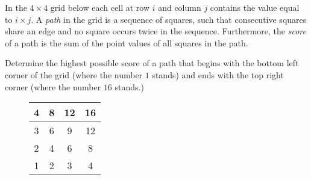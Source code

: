 \documentclass{article}
\begin{document}
\begin{example*}

    In the $4 \times 4$ grid below each cell at row $i$ and column $j$ contains the value equal to $i \times j.$
    A \textit{path} in the grid is a sequence of squares,
    such that consecutive squares share an edge and no square occurs twice in the sequence.
    Furthermore, the \textit{score} of a path is the sum of the point values of all squares in the path.

    Determine the highest possible score of a path that begins with the bottom left corner of the grid 
    (where the number $1$ stands) and ends with the top right corner (where the number $16$ stands.)
\end{example*}

\begin{figure}[h]
    \centering
    \begin{minipage}[t]{6.5cm}
        \centering
        \begin{tabular}{|c|c|c|c|}
            \hline
            \cellcolor[HTML]{EFEFEF}4 & 8                         & \cellcolor[HTML]{EFEFEF}12 & 16                         \\ \hline
            3                         & \cellcolor[HTML]{EFEFEF}6 & 9                          & \cellcolor[HTML]{EFEFEF}12 \\ \hline
            \cellcolor[HTML]{EFEFEF}2 & 4                         & \cellcolor[HTML]{EFEFEF}6  & 8                          \\ \hline
            1                         & \cellcolor[HTML]{EFEFEF}2 & 3                          & \cellcolor[HTML]{EFEFEF}4  \\ \hline
        \end{tabular}
    \end{minipage}
\end{figure}
\end{document}
